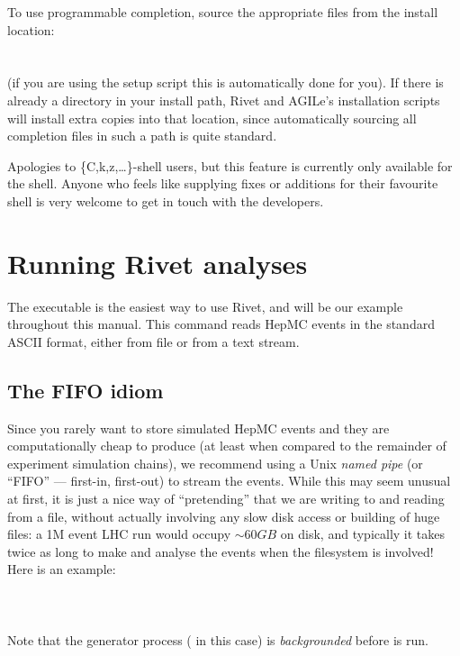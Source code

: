\documentclass{JHEP3}
\begin{document}
To use programmable completion, source the appropriate files from the install
location:\\
\\
\\
(if you are using the setup script  this is automatically
done for you).
If there is already a  directory in
your install path, Rivet and AGILe's installation scripts will install extra
copies into that location, since automatically sourcing all completion files in
such a path is quite standard.

Apologies to \{C,k,z,\dots\}-shell users, but this feature is currently only
available for the  shell. Anyone who feels like supplying fixes or
additions for their favourite shell is very welcome to get in touch with the
developers.



\section{Running Rivet analyses}
\label{sec:agile-runmc}

The  executable is the easiest way to use Rivet, and will be our
example throughout this manual. This command reads HepMC events in the standard
ASCII format, either from file or from a text stream.

\subsection{The FIFO idiom}

Since you rarely want to store simulated HepMC events and they are
computationally cheap to produce (at least when compared to the remainder of
experiment simulation chains), we recommend using a Unix \emph{named pipe} (or
``FIFO'' --- first-in, first-out) to stream the events. While this may seem
unusual at first, it is just a nice way of ``pretending'' that we are writing to
and reading from a file, without actually involving any slow disk access or
building of huge files: a 1M event LHC run would occupy $\sim 60 GB$ on disk,
and typically it takes twice as long to make and analyse the events when the 
filesystem is involved! Here is an example:\\
\\
\\
\\
%
Note that the generator process ( in this case) is
\emph{backgrounded} before  is run.
\end{document}
